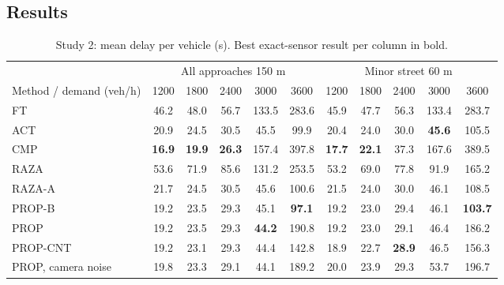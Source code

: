 \documentclass[conference]{IEEEtran}
\newcommand{\best}[1]{\textbf{#1}}
\begin{document}
\subsection{Results}
\begin{table}[t]
\caption{Study 2: mean delay per vehicle (s). Best exact-sensor result per column in bold.}
\label{tab:delay}
\centering
\begin{tabular}{lcccccccccc}
\toprule
 & \multicolumn{5}{c}{All approaches 150 m} & \multicolumn{5}{c}{Minor street 60 m}\\
\cmidrule(lr){2-6}\cmidrule(lr){7-11}
Method / demand (veh/h) & 1200 & 1800 & 2400 & 3000 & 3600 & 1200 & 1800 & 2400 & 3000 & 3600\\
\midrule
FT & 46.2 & 48.0 & 56.7 & 133.5 & 283.6 & 45.9 & 47.7 & 56.3 & 133.4 & 283.7\\
ACT & 20.9 & 24.5 & 30.5 & 45.5 & 99.9 & 20.4 & 24.0 & 30.0 & \best{45.6} & 105.5\\
CMP~\cite{gregoire2015} & \best{16.9} & \best{19.9} & \best{26.3} & 157.4 & 397.8 & \best{17.7} & \best{22.1} & 37.3 & 167.6 & 389.5\\
RAZA~\cite{raza2025} & 53.6 & 71.9 & 85.6 & 131.2 & 253.5 & 53.2 & 69.0 & 77.8 & 91.9 & 165.2\\
RAZA-A & 21.7 & 24.5 & 30.5 & 45.6 & 100.6 & 21.5 & 24.0 & 30.0 & 46.1 & 108.5\\
PROP-B & 19.2 & 23.5 & 29.3 & 45.1 & \best{97.1} & 19.2 & 23.0 & 29.4 & 46.1 & \best{103.7}\\
PROP & 19.2 & 23.5 & 29.3 & \best{44.2} & 190.8 & 19.2 & 23.0 & 29.1 & 46.4 & 186.2\\
PROP-CNT & 19.2 & 23.1 & 29.3 & 44.4 & 142.8 & 18.9 & 22.7 & \best{28.9} & 46.5 & 156.3\\
\midrule
PROP, camera noise & 19.8 & 23.3 & 29.1 & 44.1 & 189.2 & 20.0 & 23.9 & 29.3 & 53.7 & 196.7\\
\bottomrule
\end{tabular}
\end{table}
\end{document}
